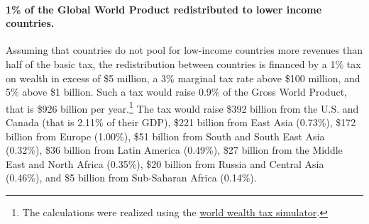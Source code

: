 \documentclass[12pt,english]{article}
\begin{document}
\paragraph{1\% of the Global World Product redistributed to lower income countries.} Assuming that countries do not pool for low-income countries more revenues than half of the basic tax, the redistribution between countries is financed by a 1\% tax on wealth in excess of \$5 million, a 3\% marginal tax rate above \$100 million, and 5\% above \$1 billion. Such a tax would raise 0.9\% of the Gross World Product, that is \$926 %
billion per year.\footnote{The calculations were realized using the \href{https://wid.world/world-wealth-tax-simulator/}{world wealth tax simulator}.} The tax would raise \$392 billion from the U.S. and Canada (that is 2.11\% of their GDP), 
\$221 billion from East Asia (0.73\%), \$172 billion from Europe (1.00\%), \$51 billion from South and South East Asia (0.32\%), \$36 billion from Latin America (0.49\%), \$27 billion from the Middle East and North Africa (0.35\%), \$20 billion from Russia and Central Asia (0.46\%), and \$5 billion from Sub-Saharan Africa (0.14\%). 
\end{document}
